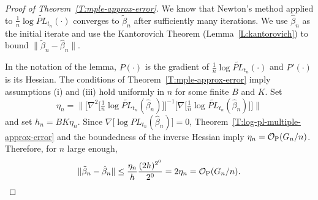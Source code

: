 \documentclass[final]{statsoc}
\newcommand{\qedhere}{}
\begin{document}
\begin{proof}[Proof of Theorem~\ref{T:mple-approx-error}]

We know that Newton's method applied to
$\tfrac{1}{n}\log \widetilde{\mathit{PL}}_{t_n}(\cdot)$ converges to
$\tilde \beta_n$ after sufficiently many iterations.  We use $\hat \beta_n$ as the
initial iterate and use the Kantorovich Theorem (Lemma~\ref{L:kantorovich})
to bound $\|\tilde \beta_n - \hat \beta_n\|$.

In the notation of the lemma, $P(\cdot)$ is the gradient of
$\tfrac{1}{n} \log \widetilde{\mathit{PL}}_{t_n}(\cdot)$ and
$P'(\cdot)$ is its Hessian.
The conditions of Theorem~\ref{T:mple-approx-error} imply assumptions
(i) and (iii) hold uniformly in $n$ for some finite $B$ and $K$.
Set
\[
    \eta_n =
    \Big\|
        \Big[
            \nabla^2\big[
                \tfrac{1}{n}
                \log \widetilde{\mathit{PL}}_{t_n}(\hat \beta_{n})
            \big]
        \Big]^{-1}
        \Big[
            \nabla\big[
                \tfrac{1}{n}
                \log \widetilde{\mathit{PL}}_{t_n}(\hat \beta_{n})
            \big]
        \Big]
    \Big\|
\]
and set $h_n = B K \eta_n$.
Since $\nabla\big[\log {\mathit{PL}}_{t_n}(\hat \beta_{n})\big] = 0$,
Theorem~\ref{T:log-pl-multiple-approx-error} and the boundedness of the
inverse Hessian imply $\eta_n = \mathcal{O}_\text{P}(G_n/n)$.  Therefore, for $n$
large enough,
\[
    \| \tilde \beta_n - \hat \beta_n \|
        \leq \frac{\eta_n}{h}\frac{(2h)^{2^0}}{2^0}
        = 2 \eta_n
        = \OhP(G_n/n).
    \qedhere
\]
\end{proof}




\end{document}

